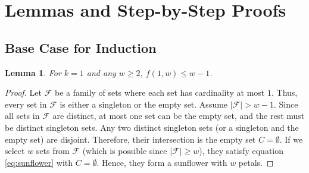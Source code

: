 \documentclass[12pt,a4paper]{article}
\newtheorem{lemma}[theorem]{Lemma}
\begin{document}
\section{Lemmas and Step-by-Step Proofs}

\subsection{Base Case for Induction}
\begin{lemma} \label{lem:base_case}
For $k=1$ and any $w \ge 2$, $f(1, w) \le w - 1$.
\end{lemma}
\begin{proof}
Let $\mathcal{F}$ be a family of sets where each set has cardinality at most $1$. Thus, every set in $\mathcal{F}$ is either a singleton or the empty set.
Assume $|\mathcal{F}| > w - 1$. Since all sets in $\mathcal{F}$ are distinct, at most one set can be the empty set, and the rest must be distinct singleton sets.
Any two distinct singleton sets (or a singleton and the empty set) are disjoint. Therefore, their intersection is the empty set $C = \emptyset$.
If we select $w$ sets from $\mathcal{F}$ (which is possible since $|\mathcal{F}| \ge w$), they satisfy equation \eqref{eq:sunflower} with $C = \emptyset$. Hence, they form a sunflower with $w$ petals.
\end{proof}
\end{document}
